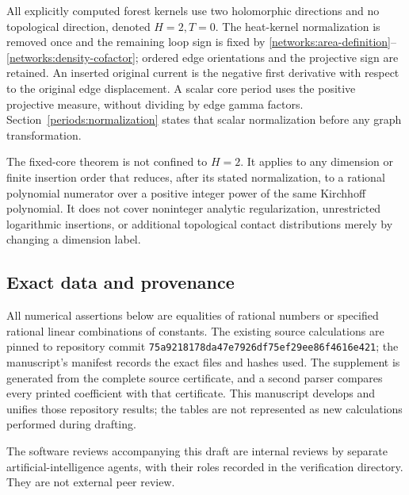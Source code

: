 All explicitly computed forest kernels use two holomorphic directions
and no topological direction, denoted $H=2,T=0$. The heat-kernel
normalization is removed once and the remaining loop sign is fixed by
\eqref{networks:area-definition}--\eqref{networks:density-cofactor};
ordered edge orientations and the projective sign are retained.
An inserted original current is the negative first derivative with
respect to the original edge displacement. A scalar core period uses
the positive projective measure, without dividing by edge gamma
factors. Section~\ref{periods:normalization} states that scalar
normalization before any graph transformation.

The fixed-core theorem is not confined to $H=2$. It applies to any
dimension or finite insertion order that reduces, after its stated
normalization, to a rational polynomial numerator over a positive
integer power of the same Kirchhoff polynomial. It does not cover
noninteger analytic regularization, unrestricted logarithmic
insertions, or additional topological contact distributions merely
by changing a dimension label.

\subsection{Exact data and provenance}

All numerical assertions below are equalities of rational numbers or
specified rational linear combinations of constants. The existing
source calculations are pinned to repository commit
\texttt{75a9218178da47e7926df75ef29ee86f4616e421}; the manuscript's
manifest records the exact files and hashes used. The supplement is
generated from the complete source certificate, and a second parser
compares every printed coefficient with that certificate. This
manuscript develops and unifies those repository results; the tables
are not represented as new calculations performed during drafting.

The software reviews accompanying this draft are internal reviews by
separate artificial-intelligence agents, with their roles recorded in
the verification directory. They are not external peer review.
